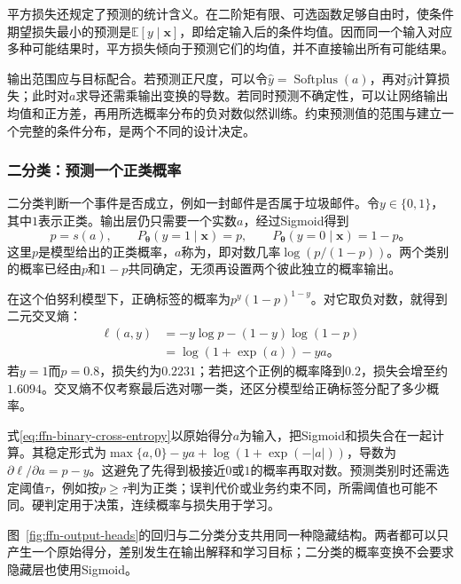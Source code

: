 平方损失还规定了预测的统计含义。在二阶矩有限、可选函数足够自由时，使条件期望损失最小的预测是$\mathbb{E}[y\mid\bm{x}]$，即给定输入后的条件均值。因而同一个输入对应多种可能结果时，平方损失倾向于预测它们的均值，并不直接输出所有可能结果。

输出范围应与目标配合。若预测正尺度，可以令$\widehat y=\operatorname{Softplus}(a)$，再对$\widehat y$计算损失；此时对$a$求导还需乘输出变换的导数。若同时预测不确定性，可以让网络输出均值和正方差，再用所选概率分布的负对数似然训练。约束预测值的范围与建立一个完整的条件分布，是两个不同的设计决定。

\subsubsection{二分类：预测一个正类概率}
\label{sec:ffn-output-binary}

二分类判断一个事件是否成立，例如一封邮件是否属于垃圾邮件。令$y\in\{0,1\}$，其中$1$表示正类。输出层仍只需要一个实数$a$，经过Sigmoid得到
\[
  p=s(a),\qquad P_{\bm{\theta}}(y=1\mid\bm{x})=p,
  \qquad P_{\bm{\theta}}(y=0\mid\bm{x})=1-p\text{。}
\]
这里$p$是模型给出的正类概率，$a$称为，即对数几率$\log(p/(1-p))$。两个类别的概率已经由$p$和$1-p$共同确定，无须再设置两个彼此独立的概率输出。

在这个伯努利模型下，正确标签的概率为$p^y(1-p)^{1-y}$。对它取负对数，就得到二元交叉熵：
\begin{equation}
  \begin{aligned}
    \ell(a,y)
      &=-y\log p-(1-y)\log(1-p)\\
      &=\log(1+\exp(a))-ya\text{。}
  \end{aligned}
  \label{eq:ffn-binary-cross-entropy}
\end{equation}
若$y=1$而$p=0.8$，损失约为$0.2231$；若把这个正例的概率降到$0.2$，损失会增至约$1.6094$。交叉熵不仅考察最后选对哪一类，还区分模型给正确标签分配了多少概率。

式\eqref{eq:ffn-binary-cross-entropy}以原始得分$a$为输入，把Sigmoid和损失合在一起计算。其稳定形式为$\max\{a,0\}-ya+\log(1+\exp(-|a|))$，导数为$\partial\ell/\partial a=p-y$。这避免了先得到极接近$0$或$1$的概率再取对数。预测类别时还需选定阈值$\tau$，例如按$p\geq\tau$判为正类；误判代价或业务约束不同，所需阈值也可能不同。硬判定用于决策，连续概率与损失用于学习。

图~\ref{fig:ffn-output-heads}的回归与二分类分支共用同一种隐藏结构。两者都可以只产生一个原始得分，差别发生在输出解释和学习目标；二分类的概率变换不会要求隐藏层也使用Sigmoid。


